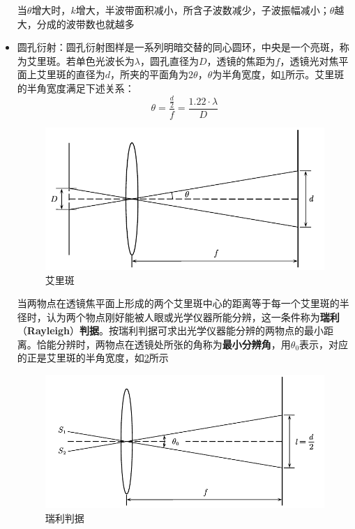 \documentclass[12pt, a4paper, twoside]{ctexbook}
\begin{document}
\begin{itemize}
    当$\theta$增大时，$k$增大，半波带面积减小，所含子波数减少，子波振幅减小；$\theta$越大，分成的波带数也就越多
    \item {\sonti 圆孔衍射}：圆孔衍射图样是一系列明暗交替的同心圆环，中央是一个亮斑，称为艾里斑。若单色光波长为$\lambda$，圆孔直径为$D$，透镜的焦距为$f$，透镜光对焦平面上艾里斑的直径为$d$，所夹的平面角为$2\theta$，$\theta$为半角宽度，如\textcolor{blue}{\cref{fig:艾里斑}}所示。艾里斑的半角宽度满足下述关系：
    $$
    \theta=\frac{\frac{d}{2}}{f}=\frac{1.22\cdot\lambda}{D}
    $$
    \begin{figure}[H]
        \centerline{\includegraphics[scale=0.90]{艾里斑.pdf}}
        \caption{艾里斑}\label{fig:艾里斑}
    \end{figure}
    当两物点在透镜焦平面上形成的两个艾里斑中心的距离等于每一个艾里斑的半径时，认为两个物点刚好能被人眼或光学仪器所能分辨，这一条件称为\textbf{瑞利}{\sonti （}\textbf{Rayleigh}{\sonti ）}\textbf{判据}。按瑞利判据可求出光学仪器能分辨的两物点的最小距离。恰能分辨时，两物点在透镜处所张的角称为\textbf{最小分辨角}，用$\theta_0$表示，对应的正是艾里斑的半角宽度，如\textcolor{blue}{\cref{fig:瑞利判据}}所示
    \begin{figure}[H]
        \centerline{\includegraphics[scale=0.90]{瑞利判据.pdf}}
        \caption{瑞利判据}\label{fig:瑞利判据}

\end{figure}
\end{itemize}
\end{document}
